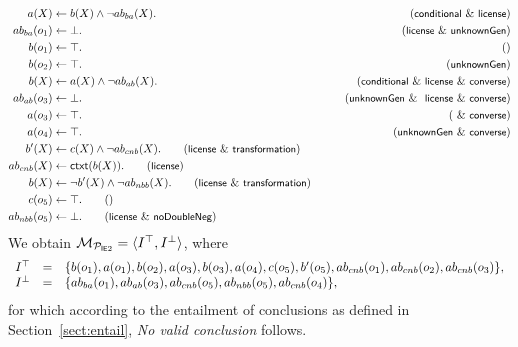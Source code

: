 \documentclass[12pt]{article}
\begin{document}
\begin{align}
a(X) & \leftarrow b(X) \wedge \neg \Ab_{ba}(X). & \tag{\conditionals\ \&\ \licenses}\\
\Ab_{ba}(o_1) & \leftarrow  \bot. & \tag{\licenses\ \& \unknownGen}\\
b(o_1) & \leftarrow  \top. & \tag{} \\
b(o_2) & \leftarrow  \top. & \tag{\unknownGen}
\medskip \\
b(X) & \leftarrow a(X) \wedge \neg \Ab_{ab}(X). & \tag{\conditionals\ \&\ \licenses\ \&\ \converse}\\
\Ab_{ab}(o_3) & \leftarrow  \bot. & \tag{\unknownGen\ \& \ \licenses\ \&\ \converse}\\
a(o_3) & \leftarrow  \top. & \tag{\ \&\ \converse} \\
a(o_4) & \leftarrow  \top. & \tag{\unknownGen\ \& \converse} 
\medskip \\
b'(X) & \leftarrow c(X) \wedge \neg \Ab_{cnb}(X).  \tag{\licenses\ \&\ \transformation} \\
\Ab_{cnb}(X)  & \leftarrow \cxt(b(X)).\tag{\licenses} \\
b(X) & \leftarrow \neg b'(X) \wedge \neg \Ab_{nbb}(X). \tag{\licenses\ \&\ \transformation} \\
c(o_5) & \leftarrow \top. \tag{} \\
\Ab_{nbb}(o_5) & \leftarrow \bot. \tag{\licenses\ \&\  \dnegation}
\end{align}
We obtain ${\cal M}_{{\cal P}_{\tiny\mbox{\textsf{I}\textsf{E}2}}} = \langle I^\top, I^\bot \rangle$, where 
\[
\begin{array}{lll}
 I^\top & = & \{ b(o_1), a(o_1), b(o_2), a(o_3), b(o_3),  a(o_4), c(o_5), b'(o_5), ab_{cnb}(o_1), ab_{cnb}(o_2), ab_{cnb}(o_3)  \}, \\
I^\bot & = & \{ ab_{ba}(o_1), ab_{ab}(o_3), ab_{cnb}(o_5), ab_{nbb}(o_5), ab_{cnb}(o_4) \}, 
\end{array}
\]
for which according to the entailment of conclusions as defined in Section~\ref{sect:entail}, \textit{No valid conclusion}
follows.
\end{document}
